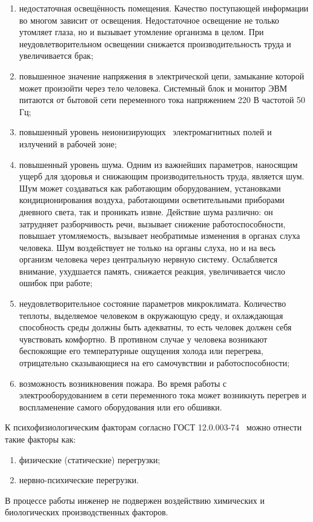 \begin{enumerate}
\item недостаточная освещённость помещения. Качество поступающей информации во многом зависит от освещения. Недостаточное освещение не только утомляет глаза, но и вызывает утомление организма в целом. При неудовлетворительном освещении снижается производительность труда и увеличивается брак;
\item повышенное значение напряжения в электрической цепи, замыкание которой может произойти через тело человека. Системный блок и монитор ЭВМ питаются от бытовой сети переменного тока напряжением 220 В частотой 50 Гц;
\item повышенный уровень неионизирующих \ электромагнитных полей и излучений в рабочей зоне;
\item повышенный уровень шума. Одним из важнейших параметров, наносящим ущерб для здоровья и снижающим производительность труда, является шум. Шум может создаваться как работающим оборудованием, установками кондиционирования воздуха, работающими осветительными приборами дневного света, так и проникать извне. Действие шума различно: он затрудняет разборчивость речи, вызывает снижение работоспособности, повышает утомляемость, вызывает необратимые изменения в органах слуха человека. Шум воздействует не только на органы слуха, но и на весь организм человека через центральную нервную систему. Ослабляется внимание, ухудшается память, снижается реакция, увеличивается число ошибок при работе;
\item неудовлетворительное состояние параметров микроклимата. Количество теплоты, выделяемое человеком в окружающую среду, и охлаждающая способность среды должны быть адекватны, то есть человек должен себя чувствовать комфортно. В противном случае у человека возникают беспокоящие его температурные ощущения холода или перегрева, отрицательно сказывающиеся на его самочувствии и работоспособности;
\item возможность возникновения пожара. Во время работы с электрооборудованием в сети переменного тока может возникнуть перегрев и воспламенение самого оборудования или его обшивки.
\end{enumerate}
К психофизиологическим факторам согласно ГОСТ 12.0.003-74~\cite{OT8} можно отнести такие факторы как:

\begin{enumerate}
\item физические (статические) перегрузки;
\item нервно-психические перегрузки.
\end{enumerate}
В процессе работы инженер не подвержен воздействию химических и биологических производственных факторов.

